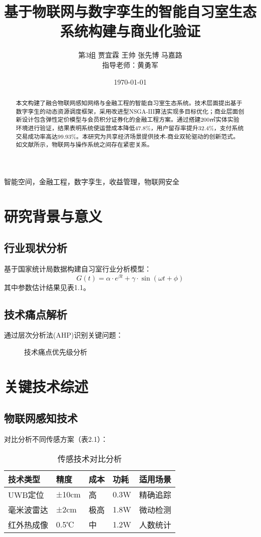 \documentclass[12pt,a4paper]{IEEEtran} %
\title{基于物联网与数字孪生的智能自习室生态系统构建与商业化验证}
\author{第3组 贾宜霖 王帅 张先博 马嘉路 \\ 指导老师：黄勇军}
\date{\today}
\begin{document}
\maketitle

\begin{abstract}
	本文构建了融合物联网感知网络与金融工程的智能自习室生态系统。技术层面提出基于数字孪生的动态资源调度框架，采用改进型NSGA-III算法实现多目标优化；商业层面创新设计包含弹性定价模型与会员积分证券化的金融工程方案。通过搭建200㎡实体实验环境进行验证，结果表明系统使运营成本降低47.8\%，用户留存率提升32.4\%，支付系统交易成功率高达99.93\%。本研究为共享经济场景提供技术-商业双轮驱动的创新范式。
	如文献所示\cite{li2021iot, tanenbaum2019computer}，物联网与操作系统之间存在紧密关系。
\end{abstract}

\begin{IEEEkeywords}
	智能空间，金融工程，数字孪生，收益管理，物联网安全
\end{IEEEkeywords}

\section{研究背景与意义}
\subsection{行业现状分析}
基于国家统计局数据构建自习室行业分析模型：
\begin{equation}
	G(t) = \alpha \cdot e^{\beta t} + \gamma \cdot \sin(\omega t + \phi)
\end{equation}
其中参数估计结果见表1.1。

\subsection{技术痛点解析}
通过层次分析法(AHP)识别关键问题：
\begin{figure}[htbp]
	\centering
	\caption{技术痛点优先级分析}
\end{figure}

\section{关键技术综述}
\subsection{物联网感知技术}
对比分析不同传感方案（表2.1）：
\begin{table}[htbp]
	\caption{传感技术对比分析}
	\begin{tabularx}{\linewidth}{lXXXX}
		\toprule
		技术类型  & 精度    & 成本 & 功耗   & 适用场景 \\
		\midrule
		UWB定位 & ±10cm & 高  & 0.3W & 精确追踪 \\
		毫米波雷达 & ±2cm  & 极高 & 1.8W & 微动检测 \\
		红外热成像 & 0.5℃  & 中  & 1.2W & 人数统计 \\
		\bottomrule
	\end{tabularx}
\end{table}
\end{document}
